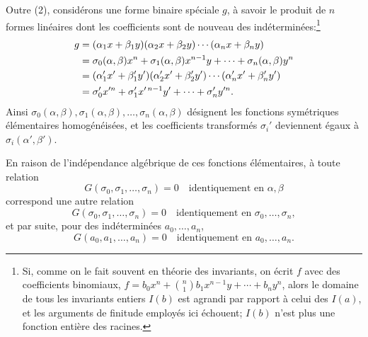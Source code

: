 Outre (2), considérons une forme binaire spéciale $g$, à savoir le produit de $n$ formes linéaires dont les coefficients sont de nouveau des indéterminées:\footnote{Si, comme on le fait souvent en théorie des invariants, on écrit $f$ avec des coefficients binomiaux, $f=b_0x^n+\binom n1b_1x^{n-1}y+\cdots+b_ny^n$, alors le domaine de tous les invariants entiers $I(b)$ est agrandi par rapport à celui des $I(a)$, et les arguments de finitude employés ici échouent; $I(b)$ n'est plus une fonction entière des racines.}
\begin{align}
        g&=(\alpha_1x+\beta_1y)(\alpha_2x+\beta_2y)\cdots(\alpha_nx+\beta_ny)\notag\\
         &=\sigma_0(\alpha,\beta)x^n+\sigma_1(\alpha,\beta)x^{n-1}y+\cdots+\sigma_n(\alpha,\beta)y^n\notag\\
         &=(\alpha_1'x'+\beta_1'y')(\alpha_2'x'+\beta_2'y')\cdots(\alpha_n'x'+\beta_n'y')\notag\\
         &=\sigma_0'x'^n+\sigma_1'x'^{\,n-1}y'+\cdots+\sigma_n'y'^n.
\end{align}
Ainsi $\sigma_0(\alpha,\beta),\sigma_1(\alpha,\beta),\ldots,\sigma_n(\alpha,\beta)$ désignent les fonctions symétriques élémentaires homogénéisées, et les coefficients transformés $\sigma_i'$ deviennent égaux à $\sigma_i(\alpha',\beta')$.

En raison de l'indépendance algébrique de ces fonctions élémentaires, à toute relation
\begin{equation}
        G(\sigma_0,\sigma_1,\ldots,\sigma_n)=0
        \quad \text{identiquement en $\alpha,\beta$}
\end{equation}
correspond une autre relation
\begin{equation}
        G(\sigma_0,\sigma_1,\ldots,\sigma_n)=0
        \quad \text{identiquement en $\sigma_0,\ldots,\sigma_n$},
\end{equation}
et par suite, pour des indéterminées $a_0,\ldots,a_n$,
\begin{equation}
        G(a_0,a_1,\ldots,a_n)=0
        \quad \text{identiquement en $a_0,\ldots,a_n$}.
\end{equation}


